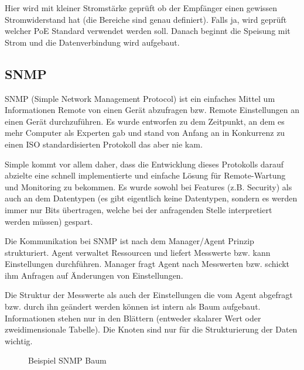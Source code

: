 Hier wird mit kleiner Stromstärke geprüft ob der Empfänger einen gewissen Stromwiderstand hat (die Bereiche sind genau definiert). Falls ja, wird geprüft welcher PoE Standard verwendet werden soll. Danach beginnt die Speisung mit Strom und die Datenverbindung wird aufgebaut.

\subsection{SNMP}
SNMP (Simple Network Management Protocol) ist ein einfaches Mittel um Informationen Remote von einen Gerät abzufragen bzw. Remote Einstellungen an einen Gerät durchzuführen. Es wurde entworfen zu dem Zeitpunkt, an dem es mehr Computer als Experten gab und stand von Anfang an in Konkurrenz zu einen ISO standardisierten Protokoll das aber nie kam.

Simple kommt vor allem daher, dass die Entwicklung dieses Protokolls darauf abzielte eine schnell implementierte und einfache Lösung für Remote-Wartung und Monitoring zu bekommen. Es wurde sowohl bei Features (z.B. Security) als auch an dem Datentypen (es gibt eigentlich keine Datentypen, sondern es werden immer nur Bits übertragen, welche bei der anfragenden Stelle interpretiert werden müssen) gespart.

Die Kommunikation bei SNMP ist nach dem Manager/Agent Prinzip strukturiert. Agent verwaltet Ressourcen und liefert Messwerte bzw. kann Einstellungen durchführen. Manager fragt Agent nach Messwerten bzw. schickt ihm Anfragen auf Änderungen von Einstellungen.

Die Struktur der Messwerte als auch der Einstellungen die vom Agent abgefragt bzw. durch ihn geändert werden können ist intern als Baum aufgebaut. Informationen stehen nur in den Blättern (entweder skalarer Wert oder zweidimensionale Tabelle). Die Knoten sind nur für die Strukturierung der Daten wichtig.

\begin{figure}[h]
  \begin{center}
    \caption{Beispiel SNMP Baum}
    \label{fig:snmptree}
  \end{center}
\end{figure}

